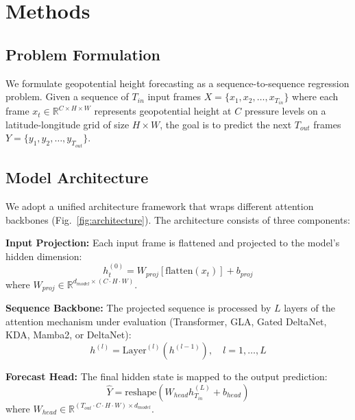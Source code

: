 \documentclass[runningheads]{llncs}
\begin{document}
\section{Methods}
\label{sec:methods}

\subsection{Problem Formulation}

We formulate geopotential height forecasting as a sequence-to-sequence regression problem. Given a sequence of $T_{in}$ input frames $X = \{x_1, x_2, \ldots, x_{T_{in}}\}$ where each frame $x_t \in \mathbb{R}^{C \times H \times W}$ represents geopotential height at $C$ pressure levels on a latitude-longitude grid of size $H \times W$, the goal is to predict the next $T_{out}$ frames $Y = \{y_1, y_2, \ldots, y_{T_{out}}\}$.

\subsection{Model Architecture}

We adopt a unified architecture framework that wraps different attention backbones (Fig.~\ref{fig:architecture}). The architecture consists of three components:

\textbf{Input Projection:} Each input frame is flattened and projected to the model's hidden dimension:
\begin{equation}
    h_t^{(0)} = W_{proj}[\text{flatten}(x_t)] + b_{proj}
\end{equation}
where $W_{proj} \in \mathbb{R}^{d_{model} \times (C \cdot H \cdot W)}$.

\textbf{Sequence Backbone:} The projected sequence is processed by $L$ layers of the attention mechanism under evaluation (Transformer, GLA, Gated DeltaNet, KDA, Mamba2, or DeltaNet):
\begin{equation}
    h^{(l)} = \text{Layer}^{(l)}(h^{(l-1)}), \quad l = 1, \ldots, L
\end{equation}

\textbf{Forecast Head:} The final hidden state is mapped to the output prediction:
\begin{equation}
    \hat{Y} = \text{reshape}(W_{head} h_{T_{in}}^{(L)} + b_{head})
\end{equation}
where $W_{head} \in \mathbb{R}^{(T_{out} \cdot C \cdot H \cdot W) \times d_{model}}$.
\end{document}
